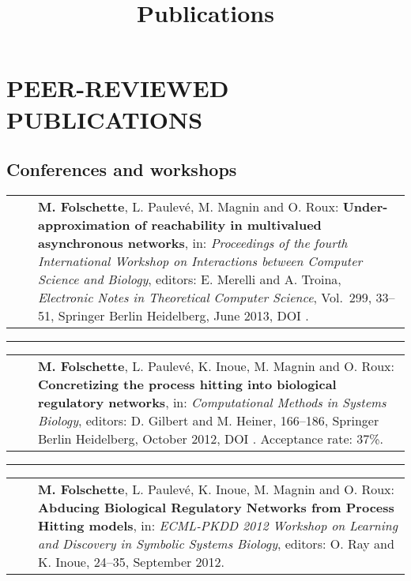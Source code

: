 \documentclass[11pt,a4paper,sans]{moderncv} %
\title{Publications}
\makeatletter
\renewcommand{\emph}{\textbf}
\newcommand{\myrule}{\vspace*{-2pt}\textcolor{color3}{\rule{\textwidth}{.5pt}}\vspace*{1pt}}
\newlength{\listitemsymbolwidthsep}
\newenvironment{publist}%
{\begin{tabular}{r@{}p{.935\textwidth}}\hspace{-\listitemsymbolwidthsep}\hspace{.45\hintscolumnwidth}}%
{\end{tabular}}
\newcommand{\newpub}[1]{\vspace{1pt}\begin{publist}\listitemsymbol~~&#1\end{publist}\vspace{1pt}}
\newcommand{\cvsectionvspace}{\vspace{.4cm}}
\newenvironment{cvsplitsection}[1]{%
  \cvsectionvspace
  \section{#1}%
}{}
\newenvironment{cvsection}[1]{%
  \cvsectionvspace
  \begin{minipage}{\textwidth}
  \section{#1}%
}{%
  \end{minipage}
}
\newenvironment{cvsubsection}[1]{%
  \vspace*{4pt}
  \begin{minipage}{\textwidth}
  \subsection{#1}%
}{%
  \end{minipage}
}
\newcommand{\vol}{Vol.\ }
\makeatother
\begin{document}
\makecvtitle %



\vspace{-1.3cm}



\begin{cvsplitsection}{PEER-REVIEWED PUBLICATIONS}

\begin{cvsubsection}{Conferences and workshops}

\newpub{\emph{M. Folschette}, L. Paulevé, M. Magnin and O. Roux: %
  \emph{Under-approximation of reachability in multivalued asynchronous networks}, %
  in: \textit{Proceedings of the fourth International Workshop on Interactions between Computer Science and Biology}, editors: E. Merelli and A. Troina, %
  \textit{Electronic Notes in Theoretical Computer Science}, \vol 299,
  33--51, Springer Berlin Heidelberg, June 2013, DOI \httplink[10.1016/j.entcs.2013.11.004]{http://dx.doi.org/10.1016/j.entcs.2013.11.004}.}

\myrule

\newpub{\emph{M. Folschette}, L. Paulevé, K. Inoue, M. Magnin and O. Roux: %
  \emph{Concretizing the process hitting into biological regulatory networks}, %
  in: \textit{Computational Methods in Systems Biology}, editors: D. Gilbert and M. Heiner, %
  166--186, Springer Berlin Heidelberg, October 2012, DOI \httplink[10.1007/978-3-642-33636-2\_11]{dx.doi.org/10.1007/978-3-642-33636-2_11}.
  Acceptance rate: 37\%.}

\myrule

\newpub{\emph{M. Folschette}, L. Paulevé, K. Inoue, M. Magnin and O. Roux:
  \emph{Abducing Biological Regulatory Networks from Process Hitting models},
  in: \textit{ECML-PKDD 2012 Workshop on Learning and Discovery in Symbolic Systems Biology}, editors: O. Ray and K. Inoue, %
  24--35, September 2012.}

\end{cvsubsection}




\end{cvsplitsection}
\end{document}
